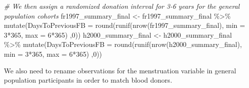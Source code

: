 \documentclass[
]{article}
\newenvironment{Shaded}{\begin{snugshade}}{\end{snugshade}}
\newcommand{\AttributeTok}[1]{\textcolor[rgb]{0.77,0.63,0.00}{#1}}
\newcommand{\CommentTok}[1]{\textcolor[rgb]{0.56,0.35,0.01}{\textit{#1}}}
\newcommand{\DecValTok}[1]{\textcolor[rgb]{0.00,0.00,0.81}{#1}}
\newcommand{\FunctionTok}[1]{\textcolor[rgb]{0.00,0.00,0.00}{#1}}
\newcommand{\NormalTok}[1]{#1}
\newcommand{\OtherTok}[1]{\textcolor[rgb]{0.56,0.35,0.01}{#1}}
\newcommand{\SpecialCharTok}[1]{\textcolor[rgb]{0.00,0.00,0.00}{#1}}
\begin{document}
\begin{Shaded}
\begin{Highlighting}[]
\CommentTok{\# We then  assign a randomized donation interval for 3{-}6 years for the general population cohorts }
\NormalTok{fr1997\_summary\_final }\OtherTok{\textless{}{-}}\NormalTok{ fr1997\_summary\_final }\SpecialCharTok{\%\textgreater{}\%} \FunctionTok{mutate}\NormalTok{(}\AttributeTok{DaysToPreviousFB =} \FunctionTok{round}\NormalTok{(}\FunctionTok{runif}\NormalTok{(}\FunctionTok{nrow}\NormalTok{(fr1997\_summary\_final), }\AttributeTok{min =} \DecValTok{3}\SpecialCharTok{*}\DecValTok{365}\NormalTok{, }\AttributeTok{max =} \DecValTok{6}\SpecialCharTok{*}\DecValTok{365}\NormalTok{) ,}\DecValTok{0}\NormalTok{))}
\NormalTok{h2000\_summary\_final }\OtherTok{\textless{}{-}}\NormalTok{ h2000\_summary\_final }\SpecialCharTok{\%\textgreater{}\%} \FunctionTok{mutate}\NormalTok{(}\AttributeTok{DaysToPreviousFB =} \FunctionTok{round}\NormalTok{(}\FunctionTok{runif}\NormalTok{(}\FunctionTok{nrow}\NormalTok{(h2000\_summary\_final), }\AttributeTok{min =} \DecValTok{3}\SpecialCharTok{*}\DecValTok{365}\NormalTok{, }\AttributeTok{max =} \DecValTok{6}\SpecialCharTok{*}\DecValTok{365}\NormalTok{) ,}\DecValTok{0}\NormalTok{))}
\end{Highlighting}
\end{Shaded}

We also need to rename observations for the menstruation variable in
general population participants in order to match blood donors.
\end{document}
